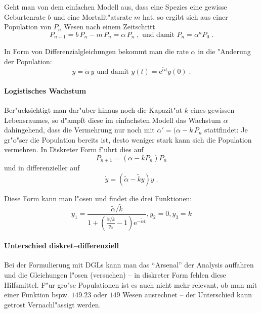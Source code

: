 \documentclass[a4paper]{book}
\newcommand{\E}{\ensuremath{\mathrm e}}
\begin{document}
Geht man von dem einfachen Modell aus, dass eine Spezies eine gewisse
Geburtenrate $b$ und eine Mortalit"atsrate $m$ hat, so ergibt sich aus
einer Population von $P_n$ Wesen nach einem Zeitschritt
\begin{equation*}
  P_{n+1} = b \, P_n - m \, P_n = \alpha \, P_n \;, \text{ und damit }
  P_n = \alpha^n P_0 \;.
\end{equation*}

In Form von Differenzialgleichungen bekommt man die rate $\alpha$ in
die "Anderung der Population:
\begin{equation*}
  \dot y = \tilde\alpha \, y \text{ und damit } y(t) = \E^{\tilde\alpha t} y(0) \;.
\end{equation*}


\paragraph{Logistisches Wachstum}
\label{sec:logistisches_wachstum}

Ber"ucksichtigt man dar"uber hinaus noch die Kapazit"at $k$ eines gewissen
Lebensraumes, so d"ampft diese im einfachsten Modell das Wachstum
$\alpha$ dahingehend, dass die Vermehrung nur noch mit $\alpha' =
(\alpha - k \, P_n$ stattfindet: Je gr"o"ser die Population bereits
ist, desto weniger stark kann sich die Population vermehren. In
Diskreter Form f"uhrt dies auf
\begin{equation*}
  P_{n+1} = (\alpha - k P_n) P_n
\end{equation*}
und in differenzieller auf
\begin{equation*}
  \dot y = (\tilde\alpha - \tilde k y) y \;.
\end{equation*}

Diese Form kann man l"osen und findet die drei Funktionen:
\begin{equation*}
  y_1 = \frac{\tilde \alpha / \tilde k}{1+(\frac{\tilde\alpha / \tilde
    k}{y_0} - 1 ) \E^{-\tilde\alpha t}} , y_2 = 0 ,
  y_3 = k
\end{equation*}

\paragraph{Unterschied diskret--differenziell}
\label{sec:unterschied_diskret_differenziell}

Bei der Formulierung mit DGLs kann man das "`Arsenal"' der Analysis
auffahren und die Gleichungen l"osen (versuchen) -- in diskreter Form
fehlen diese Hilfsmittel. F"ur gro"se Populationen ist es auch nicht
mehr relevant, ob man mit einer Funktion bspw. $149.23$ oder $149$
Wesen ausrechnet -- der Unterschied kann getrost Vernachl"assigt
werden.
\end{document}
